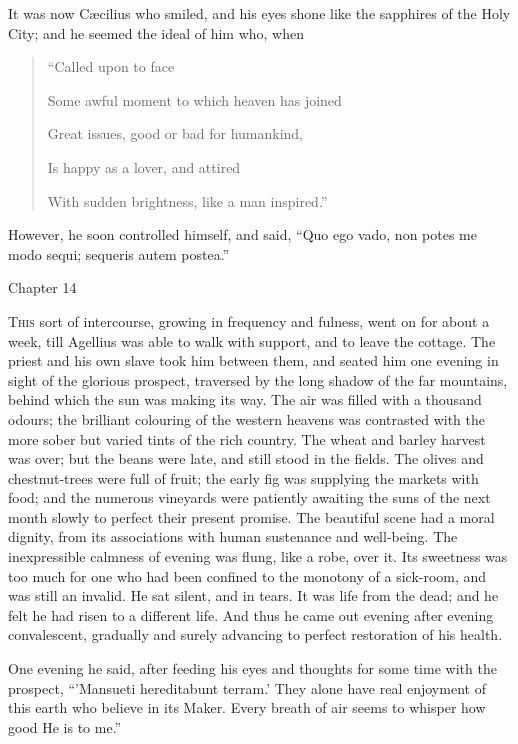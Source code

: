 It was now Cæcilius who smiled, and his eyes shone like the
sapphires of the Holy City; and he seemed the ideal of him who, when

\begin{quote}

``Called upon to face

Some awful moment to which heaven has joined

Great issues, good or bad for humankind,

Is happy as a lover, and attired

With sudden brightness, like a man inspired.''

\end{quote}

However, he soon controlled himself, and said, ``Quo ego vado,
non potes me modo sequi; sequeris autem postea.''

Chapter 14


T\textsc{his} sort of intercourse, growing in frequency and fulness,
went on for about a week, till Agellius was able to walk with support,
and to leave the cottage. The priest and his own slave took him
between them, and seated him one evening in sight of the glorious
prospect, traversed by the long shadow of the far mountains, behind
which the sun was making its way. The air was filled with a thousand
odours; the brilliant colouring of the western heavens was contrasted
with the more sober but varied tints of the rich country. The wheat
and barley harvest was over; but the beans were late, and still stood
in the fields. The olives and chestnut-trees were full of fruit; the
early fig was supplying the markets with food; and the numerous
vineyards were patiently awaiting the suns of the next month slowly to
perfect their present promise. The beautiful scene had a moral
dignity, from its associations with human sustenance and well-being.
The inexpressible calmness of evening was flung, like a robe, over it.
Its sweetness was too much for one who had been confined to the
monotony of a sick-room, and was still an invalid. He sat silent, and
in tears. It was life from the dead; and he felt he had risen to a
different life. And thus he came out evening after evening
convalescent, gradually and surely advancing to perfect restoration of
his health.

One evening he said, after feeding his eyes and thoughts for some
time with the prospect, ``'Mansueti hereditabunt terram.' They
alone have real enjoyment of this earth who believe in its Maker.
Every breath of air seems to whisper how good He is to me.''

